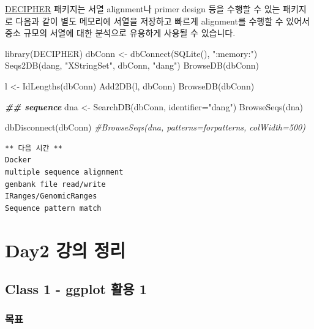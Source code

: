\documentclass[
]{book}
\newenvironment{Shaded}{\begin{snugshade}}{\end{snugshade}}
\newcommand{\AttributeTok}[1]{\textcolor[rgb]{0.77,0.63,0.00}{#1}}
\newcommand{\CommentTok}[1]{\textcolor[rgb]{0.56,0.35,0.01}{\textit{#1}}}
\newcommand{\DocumentationTok}[1]{\textcolor[rgb]{0.56,0.35,0.01}{\textbf{\textit{#1}}}}
\newcommand{\FunctionTok}[1]{\textcolor[rgb]{0.00,0.00,0.00}{#1}}
\newcommand{\NormalTok}[1]{#1}
\newcommand{\OtherTok}[1]{\textcolor[rgb]{0.56,0.35,0.01}{#1}}
\newcommand{\StringTok}[1]{\textcolor[rgb]{0.31,0.60,0.02}{#1}}
\begin{document}
\href{https://www.bioconductor.org/packages/release/bioc/html/DECIPHER.html}{DECIPHER} 패키지는 서열 alignment나 primer design 등을 수행할 수 있는 패키지로 다음과 같이 별도 메모리에 서열을 저장하고 빠르게 alignment를 수행할 수 있어서 중소 규모의 서열에 대한 분석으로 유용하게 사용될 수 있습니다.

\begin{Shaded}
\begin{Highlighting}[]
\FunctionTok{library}\NormalTok{(DECIPHER)}
\NormalTok{dbConn }\OtherTok{\textless{}{-}} \FunctionTok{dbConnect}\NormalTok{(}\FunctionTok{SQLite}\NormalTok{(), }\StringTok{":memory:"}\NormalTok{)}
\FunctionTok{Seqs2DB}\NormalTok{(dang, }\StringTok{"XStringSet"}\NormalTok{, dbConn, }\StringTok{"dang"}\NormalTok{)}
\FunctionTok{BrowseDB}\NormalTok{(dbConn)}

\NormalTok{l }\OtherTok{\textless{}{-}} \FunctionTok{IdLengths}\NormalTok{(dbConn)}
\FunctionTok{Add2DB}\NormalTok{(l, dbConn)}
\FunctionTok{BrowseDB}\NormalTok{(dbConn)}

\DocumentationTok{\#\# sequence}
\NormalTok{dna }\OtherTok{\textless{}{-}} \FunctionTok{SearchDB}\NormalTok{(dbConn, }\AttributeTok{identifier=}\StringTok{"dang"}\NormalTok{)}
\FunctionTok{BrowseSeqs}\NormalTok{(dna)}

\FunctionTok{dbDisconnect}\NormalTok{(dbConn)}
\CommentTok{\#BrowseSeqs(dna, patterns=forpatterns, colWidth=500)}
\end{Highlighting}
\end{Shaded}

\begin{verbatim}
** 다음 시간 **
Docker 
multiple sequence alignment
genbank file read/write
IRanges/GenomicRanges 
Sequence pattern match
\end{verbatim}

\hypertarget{day2-uxac15uxc758-uxc815uxb9ac}{%
\chapter{Day2 강의 정리}\label{day2-uxac15uxc758-uxc815uxb9ac}}

\hypertarget{day2_class1}{%
\section{Class 1 - ggplot 활용 1}\label{day2_class1}}

\hypertarget{day2_class1_objectives}{%
\subsection{목표}\label{day2_class1_objectives}}
\end{document}
